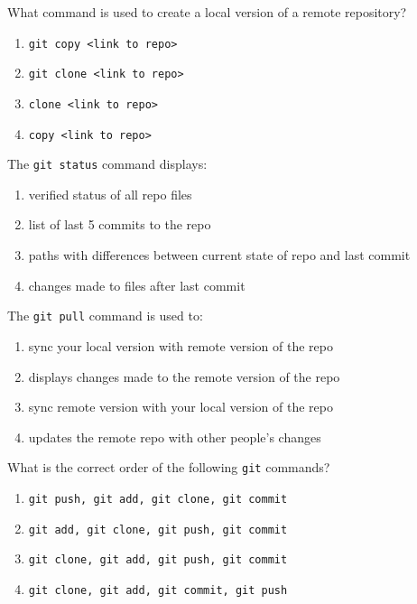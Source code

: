 \documentclass[12pt,fleqn]{examtst}
\begin{document}

\renewcommand{\labelenumi}{\Alph{enumi}.}


\noindent
\begin{minipage}{\textwidth}

What command is used to create a local version of a remote repository?

\begin{enumerate}
    \item \lstinline{git copy <link to repo>}
    \item \lstinline{git clone <link to repo>} \marker
    \item \lstinline{clone <link to repo>}
    \item \lstinline{copy <link to repo>}
\end{enumerate}

The \lstinline{git status} command displays:

\begin{enumerate}
    \item verified status of all repo files
    \item list of last 5 commits to the repo
    \item paths with differences between current state of repo and last commit \marker
    \item changes made to files after last commit
\end{enumerate}

The \lstinline{git pull} command is used to:

\begin{enumerate}
    \item sync your local version with remote version of the repo \marker
    \item displays changes made to the remote version of the repo
    \item sync remote version with your local version of the repo
    \item updates the remote repo with other people's changes
\end{enumerate}

What is the correct order of the following \lstinline{git} commands?

\begin{enumerate}
    \item \lstinline{git push, git add, git clone, git commit}
    \item \lstinline{git add, git clone, git push, git commit}
    \item \lstinline{git clone, git add, git push, git commit}
    \item \lstinline{git clone, git add, git commit, git push} \marker
\end{enumerate}

\end{minipage}
\end{document}
